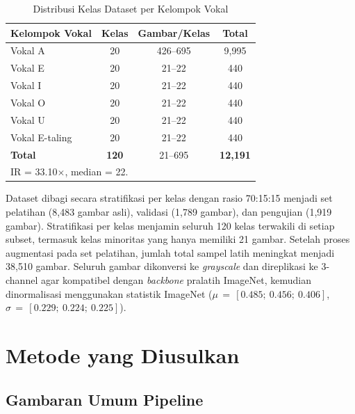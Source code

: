 \documentclass[conference]{IEEEtran}
\begin{document}
\begin{table}[t]
\caption{Distribusi Kelas Dataset per Kelompok Vokal}
\label{tab:dist}
\begin{center}
\renewcommand{\arraystretch}{1.2}
\begin{tabular}{lccc}
\toprule
\textbf{Kelompok Vokal} & \textbf{Kelas} &
  \textbf{Gambar/Kelas} & \textbf{Total} \\
\midrule
Vokal A        & 20 & 426--695 & 9,995 \\
Vokal E        & 20 & 21--22   &   440 \\
Vokal I        & 20 & 21--22   &   440 \\
Vokal O        & 20 & 21--22   &   440 \\
Vokal U        & 20 & 21--22   &   440 \\
Vokal E-taling & 20 & 21--22   &   440 \\
\midrule
\textbf{Total} & \textbf{120} & 21--695 & \textbf{12,191} \\
\bottomrule
\multicolumn{4}{l}{\footnotesize IR = 33.10$\times$, median = 22.}
\end{tabular}
\end{center}
\end{table}

Dataset dibagi secara stratifikasi per kelas dengan rasio
70:15:15 menjadi set pelatihan (8,483 gambar asli), validasi
(1,789 gambar), dan pengujian (1,919 gambar).
Stratifikasi per kelas menjamin seluruh 120 kelas terwakili
di setiap subset, termasuk kelas minoritas yang hanya memiliki
21 gambar.
Setelah proses augmentasi pada set pelatihan, jumlah total
sampel latih meningkat menjadi 38,510 gambar.
Seluruh gambar dikonversi ke \textit{grayscale} dan direplikasi ke
3-channel agar kompatibel dengan \textit{backbone} pralatih ImageNet,
kemudian dinormalisasi menggunakan statistik ImageNet
($\mu\,{=}\,[0.485;\ 0.456;\ 0.406]$,
$\sigma\,{=}\,[0.229;\ 0.224;\ 0.225]$).

\section{Metode yang Diusulkan}
\label{sec:method}

\subsection{Gambaran Umum Pipeline}
\end{document}

